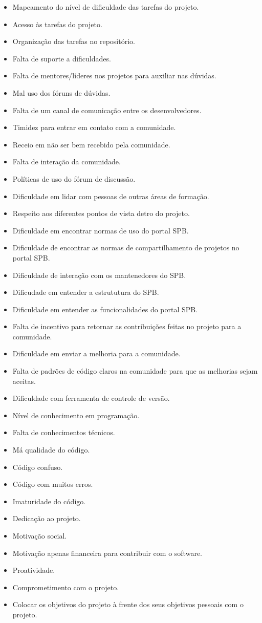 \begin{itemize}
\item Mapeamento do nível de dificuldade das tarefas do projeto.
\item Acesso às tarefas do projeto.
\item Organização das tarefas no repositório.
%
\item Falta de suporte a dificuldades.
\item Falta de mentores/líderes nos projetos para auxiliar nas dúvidas.
\item Mal uso dos fóruns de dúvidas.
\item Falta de um canal de comunicação entre os desenvolvedores.
\item Timidez para entrar em contato com a comunidade.
\item Receio em não ser bem recebido pela comunidade.
\item Falta de interação da comunidade.
\item Políticas de uso do fórum de discussão.
\item Dificuldade em lidar com pessoas de outras áreas de formação.
\item Respeito aos diferentes pontos de vista detro do projeto.
%
\item Dificuldade em encontrar normas de uso do portal SPB.
\item Dificuldade de encontrar as normas de compartilhamento de projetos no portal SPB.
\item Dificuldade de interação com os mantenedores do SPB.
\item Dificudade em entender a estrututura do SPB.
\item Dificuldade em entender as funcionalidades do portal SPB.
%
\item Falta de incentivo para retornar as contribuições feitas no projeto para a comunidade.
\item Dificuldade em enviar a melhoria para a comunidade.
\item Falta de padrões de código claros na comunidade para que as melhorias sejam aceitas.
%
\item Dificuldade com ferramenta de controle de versão.
\item Nível de conhecimento em programação.
\item Falta de conhecimentos técnicos.
%
\item Má qualidade do código.
\item Código confuso.
\item Código com muitos erros.
\item Imaturidade do código.
%
\item Dedicação ao projeto.
\item Motivação social.
\item Motivação apenas financeira para contribuir com o software.
\item Proatividade.
\item Comprometimento com o projeto.
\item Colocar os objetivos do projeto à frente dos seus objetivos pessoais com o projeto.
%

\end{itemize}

